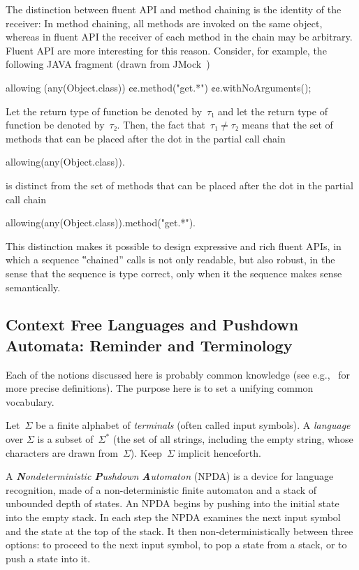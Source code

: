 The distinction between fluent API and method chaining is the identity of the receiver:
In method chaining, all methods are invoked on the same object, whereas in fluent API
  the receiver of each method in the chain may be arbitrary.
Fluent API are more interesting for this reason.
Consider, for example, the following JAVA fragment (drawn from JMock~\cite{Freeman:Pryce:06})
\begin{JAVA}
allowing (any(Object.class))
  ¢¢.method("get.*")
  ¢¢.withNoArguments();
\end{JAVA}
Let the return type of function  be denoted by~$τ₁$ and let the
  return type of function  be denoted by~$τ₂$.
Then, the fact that~$τ₁≠τ₂$ means that the set of methods that can be placed after the dot
  in the partial call chain
\begin{JAVA}
allowing(any(Object.class)).
\end{JAVA}
is distinct from the set of methods that can be placed after the dot in the partial call chain
\begin{JAVA}
allowing(any(Object.class)).method("get.*").
\end{JAVA}
This distinction makes it possible to design expressive and rich fluent APIs, in which a
  sequence ‟chained” calls is not only readable, but also robust, in the sense that the
  sequence is type correct, only when it the sequence makes sense semantically.

\subsection{Context Free Languages and Pushdown Automata: Reminder and Terminology}
Each of the notions discussed here is probably common knowledge
 (see e.g.,~\cite{Hopcroft:book:2001,must be others} for more precise definitions).
The purpose here is to set a unifying common vocabulary. 

Let~$Σ$ be a finite alphabet of \emph{terminals} (often called input symbols).
A \emph{language} over $Σ$
  is a subset of~$Σ^*$ (the set of all strings, including the empty string,
  whose characters are drawn from~$Σ$).
Keep~$Σ$ implicit henceforth.

A \emph{\textbf Nondeterministic \textbf Pushdown \textbf Automaton} (NPDA) is a device for language recognition, 
  made of a non-deterministic finite automaton 
  and a stack of unbounded depth of states.
An NPDA begins by pushing into the initial state into the empty stack.
In each step the NPDA examines the next input symbol and the state at the
  top of the stack.
It then non-deterministically between three options: to proceed to the next input symbol,  
  to pop a state from a stack, or to push a state into it. 


